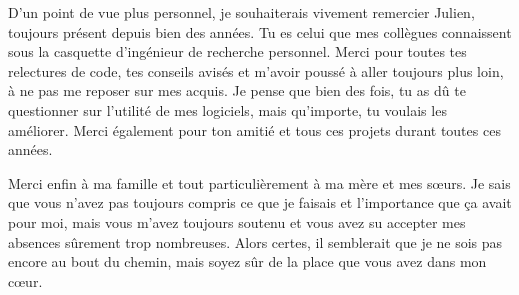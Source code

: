 \documentclass[english,a4paper,11pt,twoside]{StyleThese}
\begin{document}
D'un point de vue plus personnel, je souhaiterais vivement remercier Julien, toujours présent depuis bien des années. Tu es celui que mes collègues connaissent sous la casquette d'ingénieur de recherche personnel. Merci pour toutes tes relectures de code, tes conseils avisés et m'avoir poussé à aller toujours plus loin, à ne pas me reposer sur mes acquis. Je pense que bien des fois, tu as dû te questionner sur l'utilité de mes logiciels, mais qu'importe, tu voulais les améliorer. Merci également pour ton amitié et tous ces projets durant toutes ces années.

Merci enfin à ma famille et tout particulièrement à ma mère et mes sœurs. Je sais que vous n'avez pas toujours compris ce que je faisais et l'importance que ça avait pour moi, mais vous m'avez toujours soutenu et vous avez su accepter mes absences sûrement trop nombreuses. Alors certes, il semblerait que je ne sois pas encore au bout du chemin, mais soyez sûr de la place que vous avez dans mon cœur.

\tableofcontents

\printnoidxglossary[type=\acronymtype]
%

\mainmatter


%












\appendix






%

\end{document}
